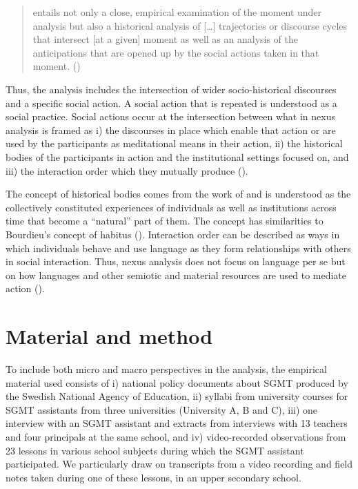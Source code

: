 \documentclass[output=paper]{langscibook}
\begin{document}
\begin{quote}
  entails not only a close, empirical examination of the moment under analysis but also a historical analysis of […] trajectories or discourse cycles that intersect [at a given] moment as well as an analysis of the anticipations that are opened up by the social actions taken in that moment. (\citealt[8]{ScollonScollon2004})
\end{quote}

\begin{sloppypar}
Thus, the analysis includes the intersection of wider socio-historical discourses and a specific social action. A social action that is repeated is understood as a social practice. Social actions occur at the intersection between what in nexus analysis is framed as i) the discourses in place which enable that action or are used by the participants as meditational means in their action, ii) the historical bodies of the participants in action and the institutional settings focused on, and iii) the interaction order which they mutually produce (\citealt{ScollonScollon2004}).
\end{sloppypar}

The concept of historical bodies comes from the work of \citet{Nishida1998} and is understood as the collectively constituted experiences of individuals as well as institutions across time that become a “natural” part of them. The concept has similarities to Bourdieu’s concept of habitus (\citealt{Bourdieu1984}). Interaction order can be described as ways in which individuals behave and use language as they form relationships with others in social interaction. Thus, nexus analysis does not focus on language per se but on how languages and other semiotic and material resources are used to mediate action (\citealt{Lane2014}).

\section{Material and method}

To include both micro and macro perspectives in the analysis, the empirical material used consists of i) national policy documents about SGMT produced by the Swedish National Agency of Education, ii) syllabi from university courses for SGMT assistants from three universities (University A, B and C), iii) one interview with an SGMT assistant and extracts from interviews with 13 teachers and four principals at the same school, and iv) video-recorded observations from 23 lessons in various school subjects during which the SGMT assistant participated. We particularly draw on transcripts from a video recording and field notes taken during one of these lessons, in an upper secondary school. 
\end{document}
